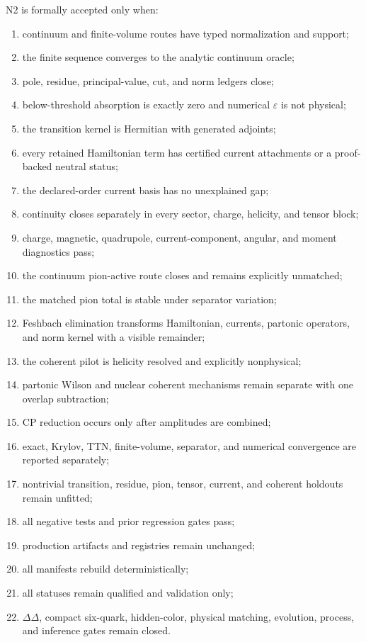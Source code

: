\documentclass[11pt]{article}
\newcommand{\eps}{\varepsilon}
\begin{document}
N2 is formally accepted only when:
\begin{enumerate}
\item continuum and finite-volume routes have typed normalization and support;
\item the finite sequence converges to the analytic continuum oracle;
\item pole, residue, principal-value, cut, and norm ledgers close;
\item below-threshold absorption is exactly zero and numerical \(\eps\) is not physical;
\item the transition kernel is Hermitian with generated adjoints;
\item every retained Hamiltonian term has certified current attachments or a proof-backed neutral status;
\item the declared-order current basis has no unexplained gap;
\item continuity closes separately in every sector, charge, helicity, and tensor block;
\item charge, magnetic, quadrupole, current-component, angular, and moment diagnostics pass;
\item the continuum pion-active route closes and remains explicitly unmatched;
\item the matched pion total is stable under separator variation;
\item Feshbach elimination transforms Hamiltonian, currents, partonic operators, and norm kernel with a visible remainder;
\item the coherent pilot is helicity resolved and explicitly nonphysical;
\item partonic Wilson and nuclear coherent mechanisms remain separate with one overlap subtraction;
\item CP reduction occurs only after amplitudes are combined;
\item exact, Krylov, TTN, finite-volume, separator, and numerical convergence are reported separately;
\item nontrivial transition, residue, pion, tensor, current, and coherent holdouts remain unfitted;
\item all negative tests and prior regression gates pass;
\item production artifacts and registries remain unchanged;
\item all manifests rebuild deterministically;
\item all statuses remain qualified and validation only;
\item \(\Delta\Delta\), compact six-quark, hidden-color, physical matching, evolution, process, and inference gates remain closed.
\end{enumerate}
\end{document}
